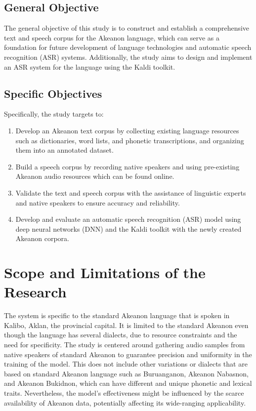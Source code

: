 \subsection{General Objective}
\label{sec:generalobjective}

The general objective of this study is to construct and establish a comprehensive text and speech corpus for the Akeanon language, which can serve as a foundation for future development of language technologies and automatic speech recognition (ASR) systems. Additionally, the study aims to design and implement an ASR system for the language using the Kaldi toolkit.


\subsection{Specific Objectives}
\label{sec:specificobjectives}

Specifically, the study targets to:
\begin{enumerate}
    \item Develop an Akeanon text corpus by collecting existing language resources such as dictionaries, word lists, and phonetic transcriptions, and organizing them into an annotated dataset.
    \item Build a speech corpus by recording native speakers and using pre-existing Akeanon audio resources which can be found online.
    \item Validate the text and speech corpus with the assistance of linguistic experts and native speakers to ensure accuracy and reliability.
    \item Develop and evaluate an automatic speech recognition (ASR) model using deep neural networks (DNN) and the Kaldi toolkit with the newly created Akeanon corpora.
 \end{enumerate}
 
\section{Scope and Limitations of the Research}
\label{sec:scopelimitations}

The system is specific to the standard Akeanon language that is spoken in Kalibo, Aklan, the provincial capital. It is limited to the standard Akeanon even though the language has several dialects, due to resource constraints and the need for specificity. The study is centered around gathering audio samples from native speakers of standard Akeanon to guarantee precision and uniformity in the training of the model. This does not include other variations or dialects that are based on standard Akeanon language such as Buruanganon, Akeanon Nabasnon, and Akeanon Bukidnon, which can have different and unique phonetic and lexical traits. Nevertheless, the model's effectiveness might be influenced by the scarce availability of Akeanon data, potentially affecting its wide-ranging applicability.

